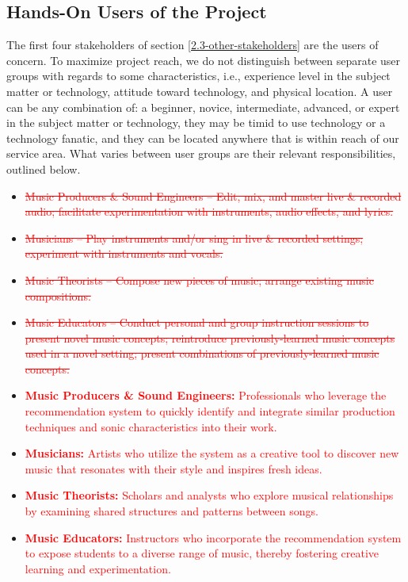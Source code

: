 \documentclass[12pt]{article}
\begin{document}
\subsection{Hands-On Users of the Project} \label{2.4-hands-on-users}
The first four stakeholders of section \ref{2.3-other-stakeholders} are the users of concern. To maximize project reach, we do not distinguish between separate user groups with regards to some characteristics, i.e., experience level in the subject matter or technology, attitude toward technology, and physical location. A user can be any combination of: a beginner, novice, intermediate, advanced, or expert in the subject matter or technology, they may be timid to use technology or a technology fanatic, and they can be located anywhere that is within reach of our service area. What varies between user groups are their relevant responsibilities, outlined below.
\begin{itemize}
  \item \textcolor{red}{\sout{Music Producers \& Sound Engineers -- Edit, mix, and master live \& recorded audio; facilitate experimentation with instruments, audio effects, and lyrics.}}  
  \item \textcolor{red}{\sout{Musicians -- Play instruments and/or sing in live \& recorded settings; experiment with instruments and vocals.}}
  \item \textcolor{red}{\sout{Music Theorists -- Compose new pieces of music; arrange existing music compositions.}}  
  \item \textcolor{red}{\sout{Music Educators -- Conduct personal and group instruction sessions to present novel music concepts; reintroduce previously-learned music concepts used in a novel setting; present combinations of previously-learned music concepts.}}
\end{itemize}

\begin{itemize}
  \item \textcolor{red}{\textbf{Music Producers \& Sound Engineers:} Professionals who leverage the recommendation system to quickly identify and integrate similar production techniques and sonic characteristics into their work.}
  \item \textcolor{red}{\textbf{Musicians:} Artists who utilize the system as a creative tool to discover new music that resonates with their style and inspires fresh ideas.}
  \item \textcolor{red}{\textbf{Music Theorists:} Scholars and analysts who explore musical relationships by examining shared structures and patterns between songs.}
  \item \textcolor{red}{\textbf{Music Educators:} Instructors who incorporate the recommendation system to expose students to a diverse range of music, thereby fostering creative learning and experimentation.}
\end{itemize}
\end{document}
